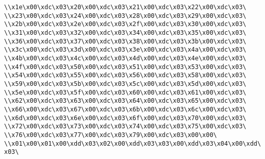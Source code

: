 \verb|\\x1e\x00\xdc\x03\x20\x00\xdc\x03\x21\x00\xdc\x03\x22\x00\xdc\x03\|\newline
\verb|\\x23\x00\xdc\x03\x24\x00\xdc\x03\x28\x00\xdc\x03\x29\x00\xdc\x03\|\newline
\verb|\\x2b\x00\xdc\x03\x2e\x00\xdc\x03\x2f\x00\xdc\x03\x30\x00\xdc\x03\|\newline
\verb|\\x31\x00\xdc\x03\x32\x00\xdc\x03\x34\x00\xdc\x03\x35\x00\xdc\x03\|\newline
\verb|\\x36\x00\xdc\x03\x37\x00\xdc\x03\x38\x00\xdc\x03\x3b\x00\xdc\x03\|\newline
\verb|\\x3c\x00\xdc\x03\x3d\x00\xdc\x03\x3e\x00\xdc\x03\x4a\x00\xdc\x03\|\newline
\verb|\\x4b\x00\xdc\x03\x4c\x00\xdc\x03\x4d\x00\xdc\x03\x4e\x00\xdc\x03\|\newline
\verb|\\x4f\x00\xdc\x03\x50\x00\xdc\x03\x51\x00\xdc\x03\x53\x00\xdc\x03\|\newline
\verb|\\x54\x00\xdc\x03\x55\x00\xdc\x03\x56\x00\xdc\x03\x58\x00\xdc\x03\|\newline
\verb|\\x59\x00\xdc\x03\x5b\x00\xdc\x03\x5c\x00\xdc\x03\x5d\x00\xdc\x03\|\newline
\verb|\\x5e\x00\xdc\x03\x5f\x00\xdc\x03\x60\x00\xdc\x03\x61\x00\xdc\x03\|\newline
\verb|\\x62\x00\xdc\x03\x63\x00\xdc\x03\x64\x00\xdc\x03\x65\x00\xdc\x03\|\newline
\verb|\\x66\x00\xdc\x03\x67\x00\xdc\x03\x6b\x00\xdc\x03\x6c\x00\xdc\x03\|\newline
\verb|\\x6d\x00\xdc\x03\x6e\x00\xdc\x03\x6f\x00\xdc\x03\x70\x00\xdc\x03\|\newline
\verb|\\x72\x00\xdc\x03\x73\x00\xdc\x03\x74\x00\xdc\x03\x75\x00\xdc\x03\|\newline
\verb|\\x76\x00\xdc\x03\x77\x00\xdc\x03\x79\x00\xdc\x03\x00\x00\|\newline
\verb|\\x01\x00\x01\x00\xdd\x03\x02\x00\xdd\x03\x03\x00\xdd\x03\x04\x00\xdd\x03\|\newline
